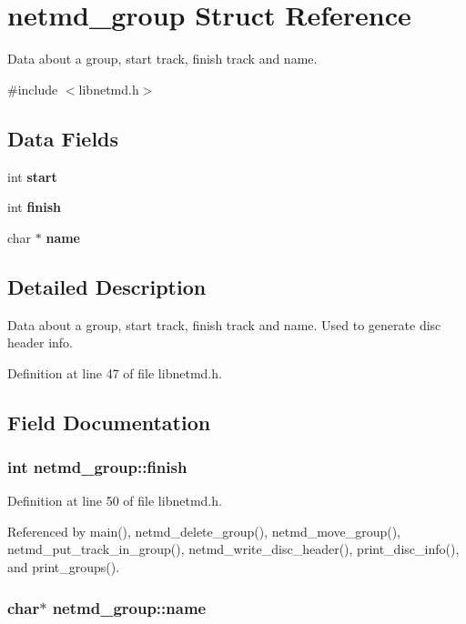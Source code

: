 \section{netmd\_\-group Struct Reference}
\label{structnetmd__group}


Data about a group, start track, finish track and name.  


{\ttfamily \#include $<$libnetmd.h$>$}\subsection*{Data Fields}
\begin{DoxyCompactItemize}
\item 
int {\bf start}
\item 
int {\bf finish}
\item 
char $\ast$ {\bf name}
\end{DoxyCompactItemize}


\subsection{Detailed Description}
Data about a group, start track, finish track and name. Used to generate disc header info. 

Definition at line 47 of file libnetmd.h.

\subsection{Field Documentation}
\subsubsection[{finish}]{\setlength{\rightskip}{0pt plus 5cm}int {\bf netmd\_\-group::finish}}\label{structnetmd__group_a7af30236ab1c8cc3b835c0697b2a2423}


Definition at line 50 of file libnetmd.h.

Referenced by main(), netmd\_\-delete\_\-group(), netmd\_\-move\_\-group(), netmd\_\-put\_\-track\_\-in\_\-group(), netmd\_\-write\_\-disc\_\-header(), print\_\-disc\_\-info(), and print\_\-groups().
\subsubsection[{name}]{\setlength{\rightskip}{0pt plus 5cm}char$\ast$ {\bf netmd\_\-group::name}}\label{structnetmd__group_a12eb00ed3614673cde34ae2907640f6c}


